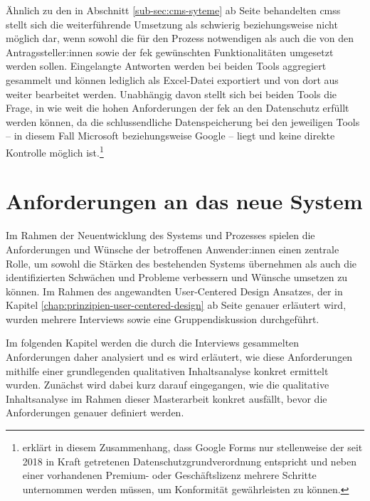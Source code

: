 \documentclass[a4paper,12pt,twoside]{scrreprt}
\begin{document}
Ähnlich zu den in Abschnitt \ref{sub-sec:cms-syteme} ab Seite \pageref{sub-sec:cms-syteme} behandelten \aclp{cms} stellt sich die weiterführende Umsetzung  als schwierig beziehungsweise nicht möglich dar, wenn sowohl die für den Prozess notwendigen als auch die von den Antragssteller:innen sowie der \ac{fek} gewünschten Funktionalitäten umgesetzt werden sollen. Eingelangte Antworten werden bei beiden Tools aggregiert gesammelt und können lediglich als Excel-Datei exportiert und von dort aus weiter bearbeitet werden. \cite{microsoft_corporation_wie_2021, google_ireland_limited_ergebnisse_2023} Unabhängig davon stellt sich bei beiden Tools die Frage, in wie weit die hohen Anforderungen der \acl{fek} an den Datenschutz erfüllt werden können, da die schlussendliche Datenspeicherung bei den jeweiligen Tools -- in diesem Fall Microsoft beziehungsweise Google -- liegt und keine direkte Kontrolle möglich ist.\footnote{\cite{visitor_analytics_gmbh_ist_2022} erklärt in diesem Zusammenhang, dass Google Forms nur stellenweise der seit 2018 in Kraft getretenen Datenschutzgrundverordnung entspricht und neben einer vorhandenen Premium- oder Geschäftslizenz mehrere Schritte unternommen werden müssen, um Konformität gewährleisten zu können.}

\chapter{Anforderungen an das neue System}
\label{chap:anforderung-neues-system}

Im Rahmen der Neuentwicklung des Systems und Prozesses spielen die Anforderungen und Wünsche der betroffenen Anwender:innen einen zentrale Rolle, um sowohl die Stärken des bestehenden Systems übernehmen als auch die identifizierten Schwächen und Probleme verbessern und Wünsche umsetzen zu können. Im Rahmen des angewandten User-Centered Design Ansatzes, der in Kapitel \ref{chap:prinzipien-user-centered-design} ab Seite \pageref{chap:prinzipien-user-centered-design} genauer erläutert wird, wurden mehrere Interviews sowie eine Gruppendiskussion durchgeführt.

Im folgenden Kapitel werden die durch die Interviews gesammelten Anforderungen daher analysiert und es wird erläutert, wie diese Anforderungen mithilfe einer grundlegenden qualitativen Inhaltsanalyse konkret ermittelt wurden. Zunächst wird dabei kurz darauf eingegangen, wie die qualitative Inhaltsanalyse im Rahmen dieser Masterarbeit konkret ausfällt, bevor die Anforderungen genauer definiert werden.
\end{document}
